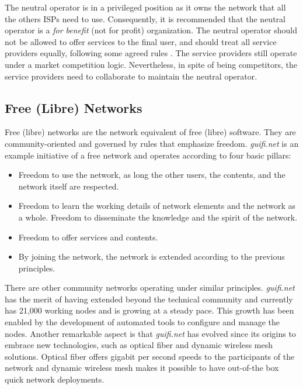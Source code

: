 \documentclass[journal]{IEEEtran}
\begin{document}
The neutral operator is in a privileged position as it owns the network that all the others ISPs need to use.
Consequently, it is recommended that the neutral operator is a \emph{for benefit} (not for profit) organization.
The neutral operator should not be allowed to offer services to the final user, and should treat all service providers equally, following some agreed rules \cite{battiti2005wireless}.
The service providers still operate under a market competition logic.
Nevertheless, in spite of being competitors, the service providers need to collaborate to maintain the neutral operator.

\subsection{Free (Libre) Networks}

Free (libre) networks are the network equivalent of free (libre) software.
They are community-oriented and governed by rules that emphasize freedom.
\emph{guifi.net} is an example initiative of a free network and operates according to four basic pillars:
\begin{itemize}
\item Freedom to use the network, as long the other users, the contents, and the network itself are respected.
\item Freedom to learn the working details of network elements and the network as a whole. Freedom to disseminate the knowledge and the spirit of the network.
\item Freedom to offer services and contents.
\item By joining the network, the network is extended according to the previous principles.
\end{itemize}

There are other community networks operating under similar principles.
\emph{guifi.net} has the merit of having extended beyond the technical community and currently has 21,000 working nodes and is growing at a steady pace.
This growth has been enabled by the development of automated tools to configure and manage the nodes.
Another remarkable aspect is that \emph{guifi.net} has evolved since its origins to embrace new technologies, such as optical fiber and dynamic wireless mesh solutions.
Optical fiber offers gigabit per second speeds to the participants of the network and dynamic wireless mesh makes it possible to have out-of-the box quick network deployments.
\end{document}
